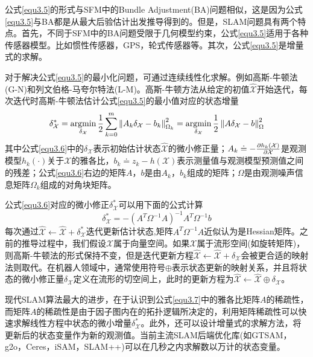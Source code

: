 公式\eqref{equ3.5}的形式与SFM中的Bundle Adjustment(BA)问题相似，这是因为公式\eqref{equ3.5}与BA都是从最大后验估计出发推导得到的。但是，SLAM问题具有两个特点。首先，不同于SFM中的BA问题受限于几何模型约束，公式\eqref{equ3.5}适用于各种传感器模型。比如惯性传感器，GPS，轮式传感器等。其次，公式\eqref{equ3.5}是增量式的求解。

对于解决公式\eqref{equ3.5}的最小化问题，可通过连续线性化求解。例如高斯-牛顿法(G-N)和列文伯格-马夸尔特法(L-M)。高斯-牛顿方法从给定的初值$\hat{\mathcal{X}}$开始迭代，每次迭代时高斯-牛顿法估计公式\eqref{equ3.5}的最小值对应的状态增量
\begin{equation}
\label{equ3.6}
\delta_\mathcal{X}^* 
=
\operatorname*{argmin} \limits_{\delta_\mathcal{X}} {1 \over 2} \sum \limits_{k=0}^{m} \left\| A_k\delta_\mathcal{X}-b_k \right\|_{\Omega_k}^2
=
\operatorname*{argmin} \limits_{\delta_\mathcal{X}} {1 \over 2} \left\| A\delta_\mathcal{X}-b \right\|_{\Omega}^2
\end{equation}
其中公式\eqref{equ3.6}中的$\delta_\mathcal{X}$表示初始估计状态$\hat{\mathcal{X}}$的微小修正量；$A_k \doteq - {\partial h_k(\mathcal{X}) \over \partial \mathcal{X}} $是观测模型$h_k(\cdot)$关于$\mathcal{X}$的雅各比，$b_k \doteq z_k-h(\mathcal{X})$表示测量值与观测模型预测值之间的残差；公式\eqref{equ3.6}右边的矩阵$A$，$b$是由$A_k$，$b_k$组成的矩阵；$\Omega$是由观测噪声信息矩阵$\Omega_k$组成的对角块矩阵。

公式\eqref{equ3.6}对应的微小修正$\delta_\mathcal{X}^* $可以用下面的公式计算
\begin{equation}
\label{equ3.7}
\delta_\mathcal{X}^* = - \left( A^T \Omega^{-1} A \right)^{-1} A^T \Omega^{-1} b
\end{equation}
每次通过$\hat{\mathcal{X}} \leftarrow \hat{\mathcal{X}}+\delta_\mathcal{X}^*$迭代更新估计状态,矩阵$A^T \Omega^{-1} A$近似认为是Hessian矩阵。之前的推导过程中，我们假设$\mathcal{X}$属于向量空间。如果$\mathcal{X}$属于流形空间(如旋转矩阵)，则高斯-牛顿法的形式保持不变，但是迭代更新方程$\hat{\mathcal{X}} \leftarrow \hat{\mathcal{X}}+\delta_\mathcal{X}$会被更合适的映射法则\upcite{[3.5]}取代。在机器人领域中，通常使用符号$\oplus$表示状态更新的映射关系，并且将状态的微小修正量$\delta_\mathcal{X}$定义在流形的切空间上，此时的更新方程为$\hat{\mathcal{X}}  \leftarrow \hat{\mathcal{X}} \oplus \delta_\mathcal{X}$。

现代SLAM算法最大的进步，在于认识到公式\eqref{equ3.7}中的雅各比矩阵$A$的稀疏性，而矩阵$A$的稀疏性是由于因子图内在的拓扑逻辑所决定的，利用矩阵稀疏性可以快速求解线性方程中状态的微小增量$\delta_\mathcal{X}^*$。此外，还可以设计增量式的求解方法，将更新后的状态变量作为新的观测值。当前主流SLAM后端优化库(如GTSAM，g2o，Ceres，iSAM，SLAM++)可以在几秒之内求解数以万计的状态变量。


